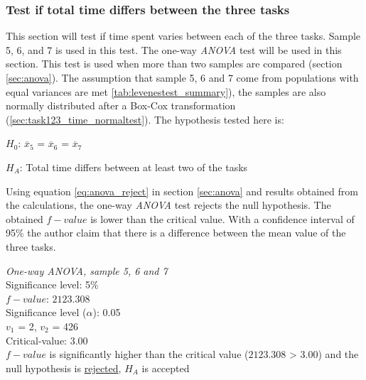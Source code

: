 \subsubsection[Sample 5, 6 and 7]{Test if total time differs between the three tasks}\label{sec:anova_result} %
This section will test if time spent varies between each of the three tasks. Sample 5, 6, and 7 is used in this test. The one-way \textit{ANOVA} test will be used in this section. This test is used when more than two samples are compared (section \ref{sec:anova}). The assumption that sample 5, 6 and 7 come from populations with equal variances are met \ref{tab:levenestest_summary}), the samples are also normally distributed after a Box-Cox transformation (\ref{sec:task123_time_normaltest}). The hypothesis tested here is:\\

\centerline{$H_{0}$: $\overline{x}_5$ = $\overline{x}_6$ = $\overline{x}_7$}
\centerline{$H_{A}$: Total time differs between at least two of the tasks}

Using equation \ref{eq:anova_reject} in section \ref{sec:anova} and results obtained from the calculations, the one-way \textit{ANOVA} test rejects the null hypothesis. The obtained $f-value$ is lower than the critical value. With a confidence interval of 95\% the author claim that there is a difference between the mean value of the three tasks.

 \begin{center}
	\begin{tcolorbox}[width=0.8\textwidth]
		\centering
		\textit{One-way \textit{ANOVA}, sample 5, 6 and 7}\\
		Significance level: 5\%  \\[0.5cm]
		
		$f-value$: $2123.308$ \\
		Significance level ($\alpha$): 0.05 \\
		$v_1$ = 2, $v_2$ = 426 \\
		Critical-value: 3.00 \\[0.2cm] %
		
		$f-value$ is significantly higher than the critical value ($2123.308$ > $3.00$) and the null hypothesis is \underline{rejected}, $H_A$ is accepted\\[0.5cm]
	\end{tcolorbox} 
\end{center}


